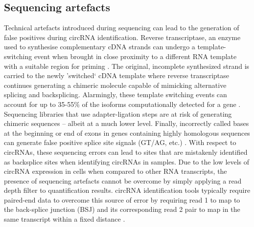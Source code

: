\documentclass[journal,review,submit,pdftex,moreauthors]{Definitions/mdpi}
\begin{document}
\subsection{Sequencing artefacts}
\noindent Technical artefacts introduced during sequencing can lead to the generation of false positives during circRNA identification. Reverse transcriptase, an enzyme used to synthesise complementary cDNA strands can undergo a template-switching event when brought in close proximity to a different RNA template with a suitable region for priming \cite{Cocquet2006Jul}. The original, incomplete synthesized strand is carried to the newly 'switched` cDNA template where reverse transcriptase continues generating a chimeric molecule capable of mimicking alternative splicing and backsplicing. Alarmingly, these template switching events can account for up to 35-55\% of the isoforms computationally detected for a gene \cite{Roy2015}. Sequencing libraries that use adapter-ligation steps are at risk of generating chimeric sequences -- albeit at a much lower level. Finally, incorrectly called bases at the beginning or end of exons in genes containing highly homologous sequences can generate false positive splice site signals (GT/AG, etc.) \cite{Salzman2014Jun}. With respect to circRNAs, these sequencing errors can lead to sites that are mistakenly identified as backsplice sites when identifying circRNAs in samples. Due to the low levels of circRNA expression in cells when compared to other RNA transcripts, the presence of sequencing artefacts cannot be overcome by simply applying a read depth filter to quantification results. circRNA identification tools typically require paired-end data to overcome this source of error by requiring read 1 to map to the back-splice junction (BSJ) and its corresponding read 2 pair to map in the same transcript within a fixed distance \cite{Salzman2012}.
\end{document}
